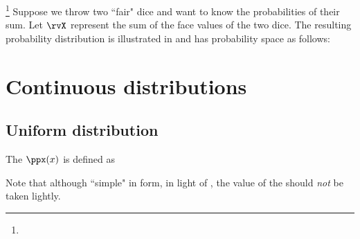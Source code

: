 \begin{example}
\footnote{
  }
\label{ex:two_dice}
Suppose we throw two ``fair" dice and want to know the probabilities of their sum.
Let $\rvX$ represent the sum  of the face values of the two dice.
The resulting probability distribution is illustrated in 
and has probability space as follows:


\end{example}

\section{Continuous distributions}
\subsection{Uniform distribution}
\begin{definition}
\label{def:uniform}
The  $\ppx(x)$ is defined as
\end{definition}

Note that although ``simple" in form, in light of , the
value of the  should \emph{not} be taken lightly.

